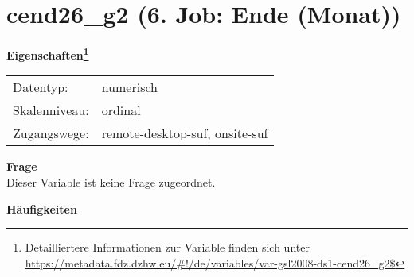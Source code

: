 
    \setcounter{footnote}{0}

    \vspace*{-1.8cm}
	\section{cend26\_g2 (6. Job: Ende (Monat))}
	\label{section:cend26_g2}



    \vspace*{0.5cm}
    \noindent\textbf{Eigenschaften\footnote{Detailliertere Informationen zur Variable finden sich unter
		\url{https://metadata.fdz.dzhw.eu/\#!/de/variables/var-gsl2008-ds1-cend26_g2$}}}\\
	\begin{tabularx}{\hsize}{@{}lX}
	Datentyp: & numerisch \\
	Skalenniveau: & ordinal \\
	Zugangswege: &
	  remote-desktop-suf, 
	  onsite-suf
 \\
    \end{tabularx}



		\vspace*{0.5cm}
		\noindent\textbf{Frage}\\
		Dieser Variable ist keine Frage zugeordnet.





        		\vspace*{0.5cm}
                \noindent\textbf{Häufigkeiten}

